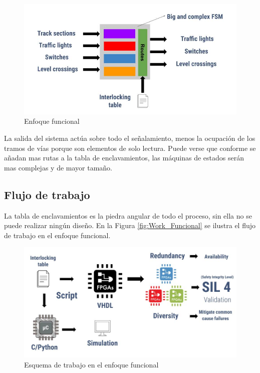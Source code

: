 			\begin{figure}[h!]
			\centering
				\includegraphics[scale=.55]{./Figures/Funcional}
				\caption{Enfoque funcional}
				\label{fig:Modelo_Funcional}
			\end{figure}
		
		\vspace{5cm}
			
		La salida del sistema actúa sobre todo el señalamiento, menos la ocupación de los tramos de vías porque son elementos de solo lectura. Puede verse que conforme se añadan mas rutas a la tabla de enclavamientos, las máquinas de estados serán mas complejas y de mayor tamaño.
	
	\subsection{Flujo de trabajo}
		
		La tabla de enclavamientos es la piedra angular de todo el proceso, sin ella no se puede realizar ningún diseño. En la Figura \ref{fig:Work_Funcional} se ilustra el flujo de trabajo en el enfoque funcional.		
			
		\begin{figure}[h]
		\centering
			\includegraphics[scale=.4]{./Figures/Funcional_workflow}
			\caption{Esquema de trabajo en el enfoque funcional}
			\label{fig:Funcional}
		\end{figure}
	
